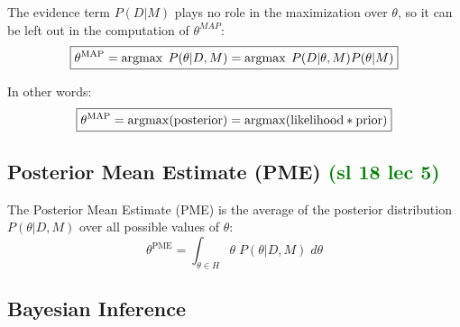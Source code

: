 The evidence term $P(D|M)$ plays no role in the maximization over $\theta$,
so it can be left out in the computation of $\theta^{MAP}$:
\begin{equation}
\boxed{\theta^{\text{MAP}} = \argmax \; P(\theta|D,M) 
                   = \argmax \; P(D|\theta,M) P(\theta|M)}
\end{equation}

In other words:
\begin{equation}
\boxed{\theta^{\text{MAP}} = \argmax (\text{posterior})
                   = \argmax (\text{likelihood} * \text{prior})}
\end{equation}


\subsection{Posterior Mean Estimate (PME) \textcolor{green}{(sl 18 lec 5)}}
\label{sec:PME}

The Posterior Mean Estimate (PME) is the average of the posterior distribution
$P(\theta|D,M)$ over all possible values of $\theta$:
\begin{equation}
\theta^{\text{PME}} = \int_{\theta \in H} \theta \; P(\theta|D,M) \; d \theta 
\end{equation}

\subsection{Bayesian Inference}

